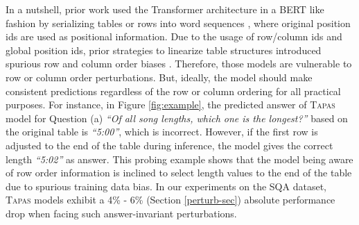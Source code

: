 \documentclass[11pt]{article}
\newcommand{\su}[1]{{\color{blue} SU: #1}}
\begin{document}
In a nutshell, prior work used the Transformer architecture in a BERT like fashion by serializing tables or rows into word sequences \cite{yu2020grappa, liu2021tapex}, where original position ids are used as positional information. Due to the usage of row/column ids and global position ids, prior strategies to linearize table structures introduced spurious row and column order biases \cite{herzig-etal-2020-tapas, eisenschlos-etal-2020-understanding, eisenschlos2021mate, zhang2020table, yin20acl}. Therefore, those models are vulnerable to row or column order perturbations.
But, ideally, the model should make consistent predictions regardless of the row or column ordering for all practical purposes. For instance, in Figure \ref{fig:example}, the predicted answer of \textsc{Tapas} model \cite{herzig-etal-2020-tapas} for Question (a) \emph{``Of all song lengths, which one is the longest?''} based on the original table is \emph{``5:00''}, which is incorrect. However, if the first row is adjusted to the end of the table during inference, the model gives the correct length \emph{``5:02''} as answer. This probing example shows that the model being aware of row order information is inclined to select length values to the end of the table due to spurious training data bias. In our experiments on the SQA dataset, \textsc{Tapas} models exhibit a 4\% - 6\% (Section \ref{perturb-sec}) absolute performance drop when facing such answer-invariant perturbations.
\end{document}
